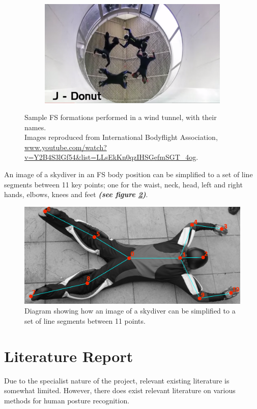\documentclass[a4paper, 12pt]{article}
\begin{document}
\begin{figure}[H]
\begin{subfigure}{.5\textwidth}
	\end{subfigure}%
	\begin{subfigure}{.5\textwidth}
		\centering
		\includegraphics[width=0.9\linewidth]{Tunnel_Donut.png}
	\end{subfigure}%
	\caption{Sample FS formations performed in a wind tunnel, with their names.\\
	Images reproduced from International Bodyflight Association, \url{www.youtube.com/watch?v=Y2B4S3lGf54&list=LLsEkKn0qzIHSGefmSGT_4og}. }
	\label{fig:sample_tunnel}
\end{figure}
%
\noindent An image of a skydiver in an FS body position can be simplified to a set of line segments between 11 key points; one for the waist, neck, head, left and right hands, elbows, knees and feet \textbf{\emph{(see figure \ref{fig:stick_model_fitted})}}.
%
\begin{figure}[H]
	\centering
	\includegraphics[width=\linewidth]{stick_model_fitted.png}
	\caption{Diagram showing how an image of a skydiver can be simplified to a set of line segments between 11 points.}
	\label{fig:stick_model_fitted}
\end{figure}
%
\section{Literature Report}
%
Due to the specialist nature of the project, relevant existing literature is somewhat limited.
However, there does exist relevant literature on various methods for human posture recognition.
\end{document}
